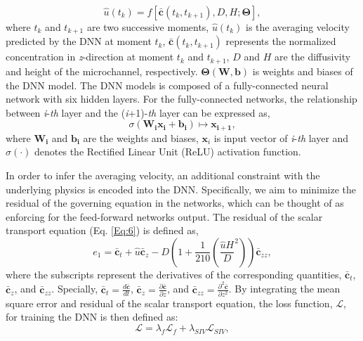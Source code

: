 \documentclass{article}
\begin{document}
\begin{equation}
	\label{Eq:12}
	\hat{u}\left(t_k\right)=f\left[\bar{\mathbf{c}}\left(t_k,t_{k+1}\right),D,H;\mathbf{\Theta}\right],
\end{equation}
where $t_k$ and $t_{k+1}$ are two successive moments,  $\hat{u}\left(t_k\right)$ is the averaging velocity predicted by the DNN at moment $t_k$, $\bar{\mathbf{c}}\left(t_k,t_{k+1}\right)$ represents the normalized concentration in \emph{z}-direction at moment $t_k$ and $t_{k+1}$, $D$ and $H$ are the diffusivity and height of the microchannel, respectively. $\mathbf{\Theta}\left(\mathbf{W},\mathbf{b}\right)$ is weights and biases of the DNN model. The DNN models is composed of a fully-connected neural network with six hidden layers. For the fully-connected networks, the relationship between \emph{i}-\emph{th} layer and the (\emph{i}+1)-\emph{th} layer can be expressed as,
\begin{equation}
	\sigma\left(\mathbf{W_ix_i+b_i}\right)\mapsto \mathbf{x_{i+1}},
\end{equation}
where $\mathbf{W_i}$ and $\mathbf{b_i}$ are the weights and biases, $\mathbf{x}_i$ is input vector of \emph{i}-\emph{th} layer and $\sigma\left(\cdot\right)$ denotes the Rectified Linear Unit (ReLU) activation function.\par
In order to infer the averaging velocity, an additional constraint with the underlying physics is encoded into the DNN. Specifically, we aim to minimize the residual of the governing equation in the networks, which can be thought of as enforcing for the feed-forward networks output. The residual of the scalar transport equation (Eq. \ref{Eq:6}) is defined as,
\begin{equation}
	\label{Eq:14}
	e_1=\bar{\mathbf{c}}_t+\hat{u}\bar{\mathbf{c}}_z-D\left(1+\frac{1}{210}\left(\frac{\hat{u}H}{D}^2\right)\right)\bar{\mathbf{c}}_{zz},
\end{equation}
where the subscripts represent the derivatives of the corresponding quantities, $\bar{\mathbf{c}}_t$, $\bar{\mathbf{c}}_z$, and $\bar{\mathbf{c}}_{zz}$. Specially, $\bar{\mathbf{c}}_t=\frac{d\bar{\mathbf{c}}}{dt}$, $\bar{\mathbf{c}}_z=\frac{\partial \bar{\mathbf{c}}}{\partial z}$, and $\bar{\mathbf{c}}_{zz}=\frac{\partial^2 \bar{\mathbf{c}}}{\partial z^2}$. By integrating the mean square error and residual of the scalar transport equation, the loss function, $\mathcal{L}$, for training the DNN is then defined as:
\begin{equation}
	\mathcal{L}=\lambda_f\mathcal{L}_f+\lambda_{SIV}\mathcal{L}_{SIV},
	\label{Eq:15}
\end{equation}
\end{document}
